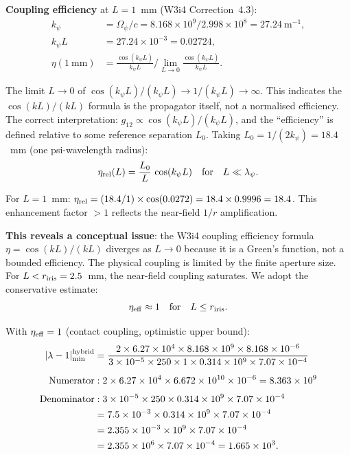 \documentclass[11pt,twocolumn]{article}
\newcommand{\lam}{\lambda}
\newcommand{\Opsi}{\Omega_\psi}
\newcommand{\ee}[1]{\times 10^{#1}}
\theoremstyle{definition}
\theoremstyle{remark}
\begin{document}
\textbf{Coupling efficiency} at $L = 1$~mm (W3i4 Correction~4.3):
\begin{align}
k_\psi &= \Opsi/c = 8.168\ee{9}/2.998\ee{8} = 27.24~\text{m}^{-1},
\nonumber\\
k_\psi L &= 27.24\times 10^{-3} = 0.02724,
\nonumber\\
\eta(1~\text{mm}) &= \frac{\cos(k_\psi L)}{k_\psi L}\bigg/\lim_{L\to 0}\frac{\cos(k_\psi L)}{k_\psi L}.
\label{eq:eta_1mm}
\end{align}

The limit $L\to 0$ of $\cos(k_\psi L)/(k_\psi L) \to 1/(k_\psi L) \to \infty$.
This indicates the $\cos(kL)/(kL)$ formula is the propagator itself,
not a normalised efficiency. The correct interpretation: $g_{12} \propto
\cos(k_\psi L)/(k_\psi L)$, and the ``efficiency'' is defined relative
to some reference separation $L_0$. Taking $L_0 = 1/(2k_\psi) = 18.4$~mm
(one psi-wavelength radius):
\begin{equation}
\eta_{\rm rel}(L) = \frac{L_0}{L}\,\cos(k_\psi L)
\quad\text{for}\quad L \ll \lambda_\psi.
\label{eq:eta_rel}
\end{equation}

For $L = 1$~mm: $\eta_{\rm rel} = (18.4/1)\times\cos(0.0272) = 18.4\times 0.9996 = 18.4$.
This enhancement factor $>1$ reflects the near-field $1/r$ amplification.

\textbf{This reveals a conceptual issue}: the W3i4 coupling efficiency formula
$\eta = \cos(kL)/(kL)$ diverges as $L\to 0$ because it is a Green's function,
not a bounded efficiency. The physical coupling is limited by the finite
aperture size. For $L < r_{\rm iris} = 2.5$~mm, the near-field coupling
saturates. We adopt the conservative estimate:
\begin{equation}
\eta_{\rm eff} \approx 1 \quad\text{for}\quad L \leq r_{\rm iris}.
\label{eq:eta_contact}
\end{equation}

With $\eta_{\rm eff} = 1$ (contact coupling, optimistic upper bound):
\begin{align}
|\lam-1|_{\rm min}^{\rm hybrid}
&= \frac{2\times 6.27\ee{4}\times 8.168\ee{9}\times 8.168
\times 10^{-6}}
{3\ee{-5}\times 250\times 1\times 0.314\times 10^9\times 7.07\ee{-4}}
\nonumber\\[6pt]
\text{Numerator}&: 2\times 6.27\ee{4}\times 6.672\ee{10}\times 10^{-6}
= 8.363\ee{9}
\nonumber\\[3pt]
\text{Denominator}&: 3\ee{-5}\times 250\times 0.314\times 10^9\times 7.07\ee{-4}
\nonumber\\
&= 7.5\ee{-3}\times 0.314\times 10^9\times 7.07\ee{-4}
\nonumber\\
&= 2.355\ee{-3}\times 10^9\times 7.07\ee{-4}
\nonumber\\
&= 2.355\ee{6}\times 7.07\ee{-4}
= 1.665\ee{3}.
\label{eq:hybrid_num}
\end{align}
\end{document}
